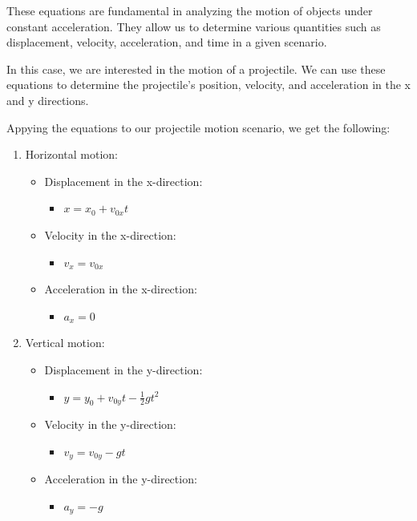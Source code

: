 \documentclass[11pt]{article}
\providecommand{\tightlist}{%
      \setlength{\itemsep}{0pt}\setlength{\parskip}{0pt}}
\begin{document}
These equations are fundamental in analyzing the motion of objects under
constant acceleration. They allow us to determine various quantities
such as displacement, velocity, acceleration, and time in a given
scenario.

In this case, we are interested in the motion of a projectile. We can
use these equations to determine the projectile's position, velocity,
and acceleration in the x and y directions.

Appying the equations to our projectile motion scenario, we get the
following:

\begin{enumerate}
\def\labelenumi{\arabic{enumi}.}
\tightlist
\item
  Horizontal motion:

  \begin{itemize}
  \tightlist
  \item
    Displacement in the x-direction:

    \begin{itemize}
    \tightlist
    \item
      \(x = x_0 + v_{0x} t\)
    \end{itemize}
  \item
    Velocity in the x-direction:

    \begin{itemize}
    \tightlist
    \item
      \(v_x = v_{0x}\)
    \end{itemize}
  \item
    Acceleration in the x-direction:

    \begin{itemize}
    \tightlist
    \item
      \(a_x = 0\)
    \end{itemize}
  \end{itemize}
\item
  Vertical motion:

  \begin{itemize}
  \tightlist
  \item
    Displacement in the y-direction:

    \begin{itemize}
    \tightlist
    \item
      \(y = y_0 + v_{0y} t - \frac{1}{2} g t^2\)
    \end{itemize}
  \item
    Velocity in the y-direction:

    \begin{itemize}
    \tightlist
    \item
      \(v_y = v_{0y} - g t\)
    \end{itemize}
  \item
    Acceleration in the y-direction:

    \begin{itemize}
    \tightlist
    \item
      \(a_y = -g\)
    \end{itemize}
  \end{itemize}
\end{enumerate}
\end{document}
